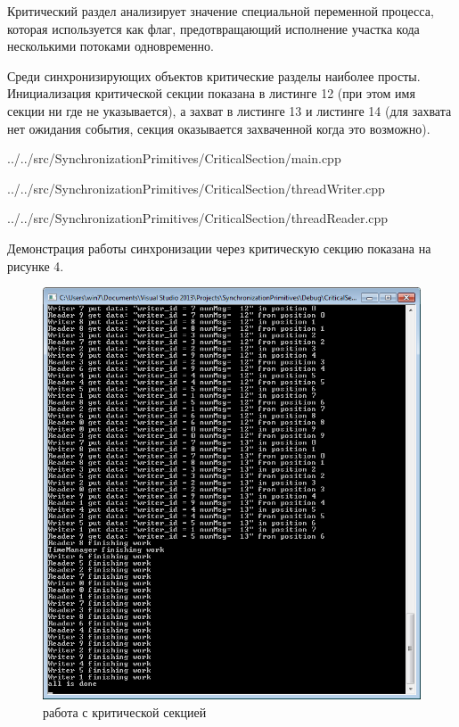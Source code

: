 \documentclass[a4paper, 12pt]{article}		%
\begin{document}
Критический раздел анализирует значение специальной переменной процесса, которая используется как флаг, предотвращающий исполнение участка кода несколькими потоками одновременно.

Среди синхронизирующих объектов критические разделы наиболее просты. Инициализация критической секции показана в листинге 12 (при этом имя секции ни где не указывается), а захват в листинге 13 и листинге 14 (для захвата нет ожидания события, секция оказывается захваченной когда это возможно).


{../../src/SynchronizationPrimitives/CriticalSection/main.cpp}


{../../src/SynchronizationPrimitives/CriticalSection/threadWriter.cpp}

\newpage

{../../src/SynchronizationPrimitives/CriticalSection/threadReader.cpp}

Демонстрация работы синхронизации через критическую секцию показана на рисунке 4.

\begin{figure}[h!]
\centering
\includegraphics[scale=1]{res/003}
\caption{работа с критической секцией}
\end{figure}
\end{document}

